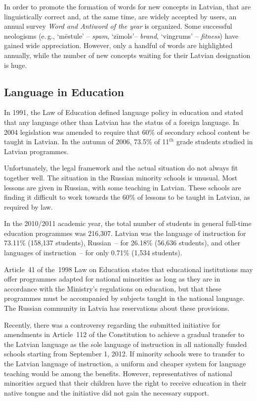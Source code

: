 \begin{multicols}{2}
In order to promote the formation of words for new concepts in Latvian, that are linguistically correct and, at the same time, are widely accepted by users, an annual survey \textit{Word and Antiword of the year} is organized.  Some successful neologisms (e.\,g., `mēstule' -- \textit{spam}, `zīmols'-- \textit{brand}, `vingrums' -- \textit{fitness}) have gained wide appreciation.  However, only a handful of words are highlighted annually, while the number of new concepts waiting for their Latvian designation is huge.

\subsection{Language in Education}

In 1991, the Law of Education defined language policy in education and stated that any language other than Latvian has the status of a foreign language.
In 2004 legislation was amended to require that 60\% of secondary school content be taught in Latvian.
In the autumn of 2006, 73.5\% of 11${}^{th}$ grade students studied in Latvian programmes.

Unfortunately, the legal framework and the actual situation do not always fit together well.
The situation in the Russian minority schools is unusual.
Most lessons are given in Russian, with some teaching in Latvian.
These schools are finding it difficult to work towards the 60\% of lessons to be taught in Latvian, as required by law.


In the 2010/2011 academic year, the total number of students in general full-time education programmes was 216,307.
Latvian was the language of instruction for 73.11\% (158,137 students), Russian~-- for 26.18\% (56,636 students), and other languages of instruction~-- for only 0.71\% (1,534 students).

Article~41 of the~1998 Law on Education states that educational institutions may offer programmes adapted for national minorities as long as they are in accordance with the Ministry's regulations on education, but that these programmes must be accompanied by subjects taught in the national language.
The Russian community in Latvia has reservations about these provisions.

Recently, there was a controversy regarding the submitted initiative for amendments in Article~112 of the Constitution to achieve a gradual transfer to the Latvian language as the sole language of instruction in all nationally funded schools starting from September 1, 2012.
If minority schools were to transfer to the Latvian language of instruction, a uniform and cheaper system for language teaching would be among the benefits.
However, representatives of national minorities argued that their children have the right to receive education in their native tongue and the initiative did not gain the necessary support.


\end{multicols}
